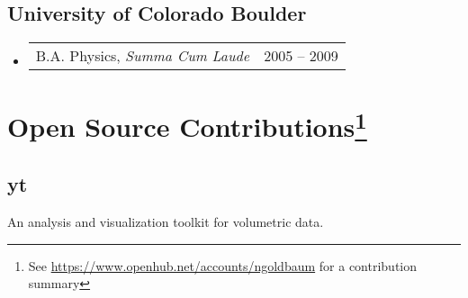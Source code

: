 \documentclass[10pt,letterpaper]{article}
\newcommand{\textline}[2]{
  \begin{tabularx}{\textwidth}{XY}
  #1 & #2
  \end{tabularx}
}
\begin{document}
\subsection*{University of Colorado Boulder}
\begin{itemize}
  \item[] \textline{B.A. Physics, \textit{Summa Cum Laude}}{2005 -- 2009}  %
\end{itemize}

\section*{Open Source Contributions\footnote{See
    \href{https://www.openhub.net/accounts/ngoldbaum}{https://www.openhub.net/accounts/ngoldbaum}
    for a contribution summary}}

\subsection*{yt}
An analysis and visualization toolkit for volumetric data.
\end{document}
